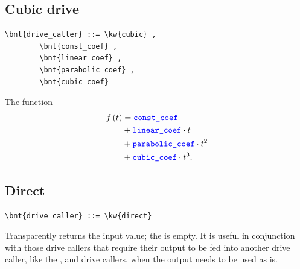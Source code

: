 \subsection{Cubic drive}
\begin{Verbatim}[commandchars=\\\{\}]
    \bnt{drive_caller} ::= \kw{cubic} ,
        \bnt{const_coef} , 
        \bnt{linear_coef} ,
        \bnt{parabolic_coef} , 
        \bnt{cubic_coef}
\end{Verbatim}
The function
\begin{align}
	f\left( t \right) &= \textcolor{blue}{\texttt{const\_coef}} \nonumber \\
		&+ \textcolor{blue}{\texttt{linear\_coef}} \cdot t \nonumber \\
		&+ \textcolor{blue}{\texttt{parabolic\_coef}} \cdot t^2 \nonumber \\
		&+ \textcolor{blue}{\texttt{cubic\_coef}} \cdot t^3
	.
\end{align}

\subsection{Direct}
\begin{Verbatim}[commandchars=\\\{\}]
    \bnt{drive_caller} ::= \kw{direct}
\end{Verbatim}
Transparently returns the input value; the  is empty.
It is useful in conjunction with those drive callers
that require their output to be fed into another drive caller,
like the ,  and 
drive callers, when the output needs to be used as is.

